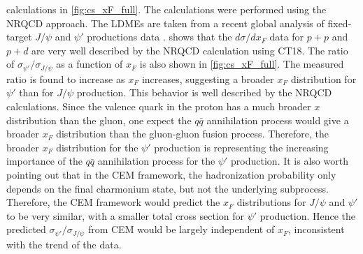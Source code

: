 \documentclass[../main.tex]{subfiles}
\begin{document}
calculations in \cref{fig:cs_xF_full}. The calculations were performed using the NRQCD approach.
The LDMEs are taken from a recent global analysis of fixed-target $J/\psi$ and $\psi'$ productions data \cite{hsieh2021,chang2023}.
 shows that the $d\sigma/dx_F$ data for $p+p$ and $p+d$ are very well described
by the NRQCD calculation using CT18. The ratio of $\sigma_{\psi'}/\sigma_{J/\psi}$ as a function of $x_F$
is also shown in \cref{fig:cs_xF_full}. The measured ratio is found to increase as $x_F$ increases,
suggesting a broader $x_F$ distribution for $\psi'$ than for $J/\psi$ production. 
This behavior is well described by the NRQCD calculations.
Since the valence quark in the proton has a much broader $x$ distribution than the gluon,
one expect the $q\bar{q}$ annihilation process would give a broader $x_F$ distribution than the
gluon-gluon fusion process. Therefore, the broader $x_F$ distribution for the $\psi'$ production
is representing the increasing importance of the $q\bar{q}$ annihilation process for the $\psi'$
production.
It is also worth pointing out that in the CEM framework, the hadronization probability only depends on
the final charmonium state, but not the underlying subprocess. Therefore, the CEM framework would predict
the $x_F$ distributions for $J/\psi$ and $\psi'$ to be very similar, with a smaller total cross section
for $\psi'$ production. Hence the predicted $\sigma_{\psi'}/\sigma_{J/\psi}$ from CEM would be
largely independent of $x_F$, inconsistent with the trend of the data.
\end{document}
